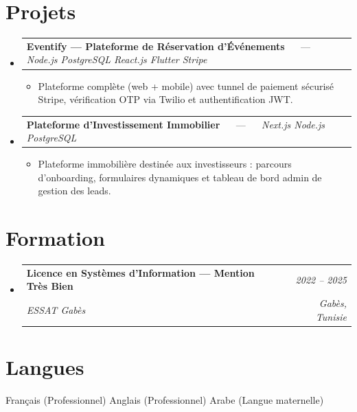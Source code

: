 \documentclass[letterpaper,9pt]{article}
\makeatletter
\newcommand{\resumeItem}[1]{\item\small{{#1}}}
\newcommand{\resumeSubheading}[4]{
  \vspace{-1pt}\item
  \begin{tabular*}{0.97\textwidth}[t]{l@{\extracolsep{\fill}}r}
    \textbf{#1} & \textit{\color{greytext}#2} \\
    \textit{\small\color{greytext} #3} & \textit{\small\color{greytext} #4}
  \end{tabular*}\vspace{-2pt}
}
\newcommand{\resumeProjectHeading}[2]{
  \item
  \begin{tabular*}{0.97\textwidth}{l@{\extracolsep{\fill}}r}
    \small #1 & #2
  \end{tabular*}\vspace{-1pt}
}
\newcommand{\resumeSubHeadingListStart}{\begin{itemize}[leftmargin=0.18in, label={}, itemsep=1.2pt, topsep=2.5pt, parsep=0pt]}
\newcommand{\resumeSubHeadingListEnd}{\end{itemize}\vspace{-2pt}}
\newcommand{\resumeProjectListStart}{\begin{itemize}[leftmargin=0.24in, label={}, itemsep=0.9pt, topsep=1.2pt, parsep=0pt]}
\newcommand{\resumeProjectListEnd}{\end{itemize}\vspace{-2pt}}
\makeatother
\begin{document}
\section{Projets}
\resumeSubHeadingListStart

  \resumeProjectHeading{\textbf{Eventify --- Plateforme de Réservation d'Événements} $\quad$ --- $\quad$ \emph{\color{greytext}Node.js \textperiodcentered{} PostgreSQL \textperiodcentered{} React.js \textperiodcentered{} Flutter \textperiodcentered{} Stripe}}{}
    \resumeProjectListStart
      \resumeItem{Plateforme complète (web + mobile) avec tunnel de paiement sécurisé Stripe, vérification OTP via Twilio et authentification JWT.}
    \resumeProjectListEnd

  \resumeProjectHeading{\textbf{Plateforme d'Investissement Immobilier} $\quad$ --- $\quad$ \emph{\color{greytext}Next.js \textperiodcentered{} Node.js \textperiodcentered{} PostgreSQL}}{}
    \resumeProjectListStart
      \resumeItem{Plateforme immobilière destinée aux investisseurs : parcours d'onboarding, formulaires dynamiques et tableau de bord admin de gestion des leads.}
    \resumeProjectListEnd
\resumeSubHeadingListEnd\vspace{-3pt}

\section{Formation}
\resumeSubHeadingListStart
  \resumeSubheading{Licence en Systèmes d'Information --- Mention Très Bien}{2022 -- 2025}{ESSAT Gabès}{Gabès, Tunisie}
\resumeSubHeadingListEnd\vspace{-1pt}

\section{Langues}
\begin{itemize}[leftmargin=0.18in, label={}, topsep=2pt, itemsep=1pt, parsep=0pt]
\footnotesize{
  \item Français (Professionnel) \textperiodcentered{} Anglais (Professionnel) \textperiodcentered{} Arabe (Langue maternelle)
}
\end{itemize}
\end{document}
